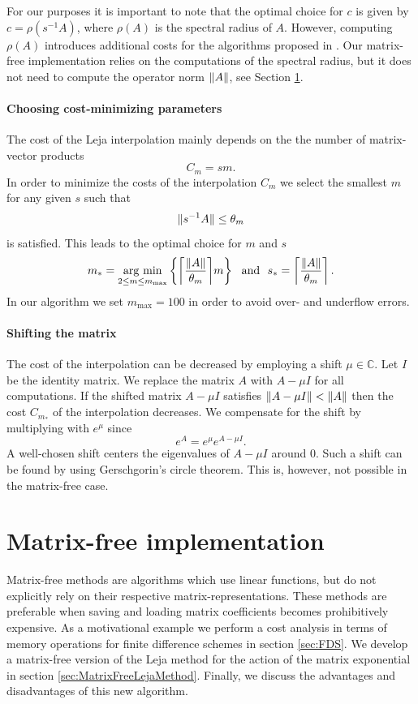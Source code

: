 \documentclass{scrartcl}
\begin{document}
	For our purposes it is important to note that the optimal choice for $c$ is given by $c=\rho(s^{-1}A)$, where $\rho(A)$ is the spectral radius of $A$. However, computing $\rho(A)$ introduces additional costs for the algorithms proposed in \cite{lejarev}. Our matrix-free implementation relies on the computations of the spectral radius, but it does not need to compute the operator norm $\lVert A\rVert$, see Section \ref{sec:matrixfreeimplementation}.
	
	\paragraph{Choosing cost-minimizing parameters}
	The cost of the Leja interpolation mainly depends on the the number of matrix-vector products
	\[
	C_{m} = sm. 
	\]
	In order to minimize the costs of the interpolation $C_m$ we select the smallest $m$ for any given $s$ such that
	\[
	\lVert s^{-1}A\rVert \le \theta_m
	\]
	is satisfied. This leads to the optimal choice for $m$ and $s$ 
	\begin{align}
	\begin{split}
	m_* = \underset{2\le m\le m_{\operatorname{max}}}{\operatorname{arg\ min}}  \left\{{\left\lceil{\frac{\norm{A}}{\theta_m}}\right\rceil}m\right\} ~~\text{and}~~
	s_* =  \left\lceil{\frac{\norm{A}}{\theta_m}}\right\rceil.
	\end{split} \label{eq:ms}
	\end{align}
	In our algorithm we set $m_{\operatorname{max}} = 100$ in order to avoid over- and underflow errors.
	
	\paragraph{Shifting the matrix}
	The cost of the interpolation can be decreased by employing a shift $\mu\in\mathbb{C}$. Let $I$ be the identity matrix. We replace the matrix $A$ with $A-\mu I$ for all computations. If the shifted matrix $A-\mu I$ satisfies $\lVert A -\mu I\rVert < \lVert A\rVert$ then the cost $C_{m_*}$ of the interpolation decreases.
	We compensate for the shift by multiplying with $e^\mu$ since
	\[
	e^{A} = e^{\mu}e^{A-\mu I}.
	\]
	A well-chosen shift centers the eigenvalues of $A-\mu I$ around $0$. Such a shift can be found by using Gerschgorin's circle theorem. This is, however, not possible in the matrix-free case.
	
	\section{Matrix-free implementation}\label{sec:matrixfreeimplementation}
Matrix-free methods are algorithms which use linear functions, but do not explicitly rely on their respective matrix-representations. These methods are preferable when saving and loading matrix coefficients becomes prohibitively expensive. As a motivational example we perform a cost analysis in terms of memory operations for finite difference schemes in section \ref{sec:FDS}.
We develop a matrix-free version of the Leja method for the action of the matrix exponential in section \ref{sec:MatrixFreeLejaMethod}. Finally, we discuss the advantages and disadvantages of this new algorithm.
\end{document}
